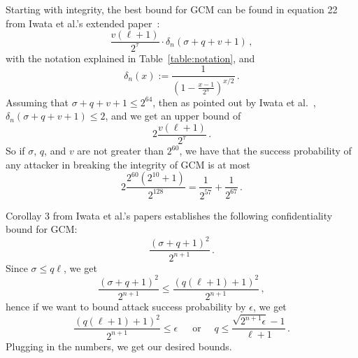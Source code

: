 \documentclass{article}
\newcommand{\defeq}{:=}
\begin{document}
Starting with integrity, the best bound for GCM can be found in equation 22 from Iwata et al.'s extended paper~\cite{cryptoeprint:2012:438}:
\begin{equation}
  \frac{v(\ell+1)}{2^\tau}\cdot\delta_n(\sigma+q+v+1)\,,
\end{equation}
with the notation explained in Table~\ref{table:notation}, and
\begin{equation}
  \delta_n(x) \defeq \frac{1}{\left(1 - \frac{x-1}{2^n}\right)^{x/2}}\,.
\end{equation}
Assuming that $\sigma+q+v+1\le 2^{64}$, then as pointed out by Iwata et al.\ , $\delta_n(\sigma+q+v+1) \le 2$, and we get an upper bound of
\begin{equation}
  2\frac{v(\ell+1)}{2^\tau}\,.
\end{equation}
So if $\sigma$, $q$, and $v$ are not greater than $2^{60}$, we have that the success probability of any attacker in breaking the integrity of GCM is at most
\begin{equation}
  2\frac{2^{60}(2^{10}+1)}{2^{128}} = \frac{1}{2^{57}} + \frac{1}{2^{67}}\,.
\end{equation}

Corollay 3 from Iwata et al.'s papers establishes the following confidentiality bound for GCM:
\begin{equation}
  \frac{(\sigma+q+1)^2}{2^{n+1}}\,.
\end{equation}
Since $\sigma\le q\ell$, we get
\begin{equation}
  \frac{(\sigma+q+1)^2}{2^{n+1}} \le \frac{(q(\ell+1)+1)^2}{2^{n+1}}\,,
\end{equation}
hence if we want to bound attack success probability by $\epsilon$, we get
\begin{equation}\label{eq:querybound}
  \frac{(q(\ell+1)+1)^2}{2^{n+1}} \le \epsilon\,\quad\text{ or }\quad q \le \frac{\sqrt{2^{n+1}\epsilon}-1}{\ell+1}\,.
\end{equation}
Plugging in the numbers, we get our desired bounds.



\end{document}
